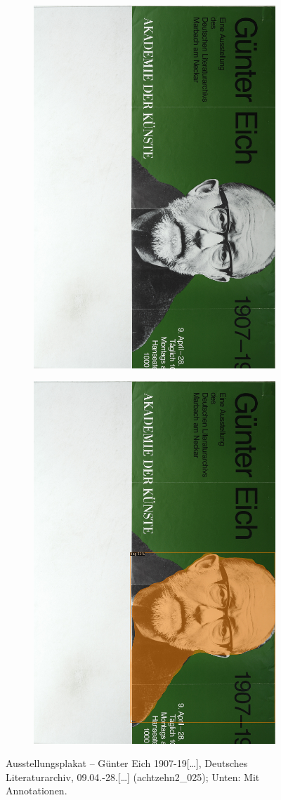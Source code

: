 \documentclass[a4paper,12pt,ngerman]{article}
\begin{document}
\newpage
\begin{figure}[ht]
	\begin{subfigure}[b]{\linewidth}
	\centering
	\includegraphics[height=\linewidth, angle=90]{Abbildung_52_(achtzehn2_025)}
	\end{subfigure}
	\begin{subfigure}[b]{\linewidth}
	\centering
	\includegraphics[height=\linewidth, angle=90]{Abbildung_52_(achtzehn2_025)_with_detections}
	\end{subfigure}
	\caption{Ausstellungsplakat -- Günter Eich 1907-19[…], Deutsches Literaturarchiv, 09.04.-28.[…] (achtzehn2\_025); Unten: Mit Annotationen.}
\end{figure}
\end{document}
